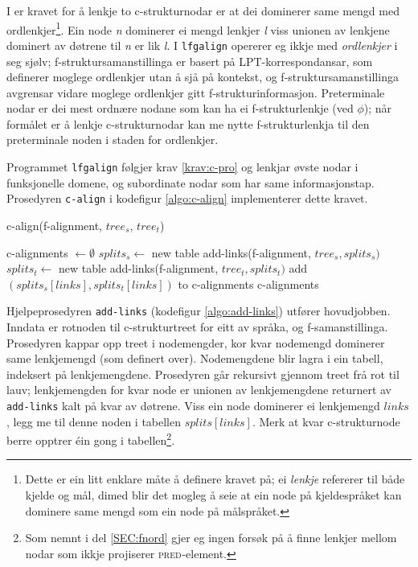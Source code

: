 \documentclass[12pt,a4paper,oneside,draft]{report}
\newcommand{\F}[2]{\textsc{#1}\ensuremath{_{#2}}}
\newcommand{\PRED}{\F{pred}{}}
\begin{document}
I \citet[s.~77]{dyvik2009lmp} er kravet for å lenkje to
c\hyp{}strukturnodar er at dei dominerer same mengd med
ordlenkjer\footnote{Dette er ein litt enklare måte å definere kravet på; ei
        \emph{lenkje} refererer til både kjelde og mål, dimed blir det
        mogleg å seie at ein node på kjeldespråket kan dominere same
        mengd som ein node på målspråket. }. Ein node \emph{n} dominerer ei mengd lenkjer \emph{l} viss
unionen av lenkjene dominert av døtrene til \emph{n} er lik \emph{l}. I
\texttt{lfgalign} opererer eg ikkje med \emph{ordlenkjer} i seg sjølv;
f\hyp{}struktursamanstillinga er basert på LPT\hyp{}korrespondansar, som
definerer moglege ordlenkjer utan å sjå på kontekst, og
f\hyp{}struktursamanstillinga avgrensar vidare moglege ordlenkjer gitt
f\hyp{}strukturinformasjon. Preterminale nodar er dei mest ordnære nodane
som kan ha ei f\hyp{}strukturlenkje (ved $\phi$); når formålet er å lenkje
c\hyp{}strukturnodar kan me nytte f\hyp{}strukturlenkja til den preterminale
noden i staden for ordlenkjer.

Programmet \texttt{lfgalign} følgjer krav \ref{krav:c-pro} og
lenkjar øvste nodar i funksjonelle domene, og subordinate nodar som
har same informasjonstap. Prosedyren \texttt{c-align} i kodefigur
\ref{algo:c-align} implementerer dette kravet. 

 \begin{algorithm}[htbp]
   \caption{c-align(f-alignment, $tree_s$, $tree_t$)}
   \label{algo:c-align}
    
   c-alignments $\gets \emptyset$ \;
   $splits_s \gets$ new table \;
   add-links(f-alignment, $tree_s, splits_s)$  \;
   $splits_t \gets$ new table \;
   add-links(f-alignment, $tree_t, splits_t)$  \;
    {
        {
             add $(splits_s[links],splits_t[links])$ to c-alignments \;
        }
    }
    \Return c-alignments \;
    \end{algorithm}    

Hjelpeprosedyren \texttt{add-links} (kodefigur \ref{algo:add-links}) utfører
 hovudjobben. Inndata er rotnoden til c\hyp{}strukturtreet for eitt av
 språka, og f-samanstillinga. Prosedyren kappar opp treet i
 nodemengder, kor kvar nodemengd dominerer same lenkjemengd (som
 definert over).  Nodemengdene blir lagra i ein tabell, indeksert på
 lenkjemengdene. Prosedyren går rekursivt gjennom treet frå rot til
 lauv; lenkjemengden for kvar node er unionen av lenkjemengdene
 returnert av \texttt{add-links} kalt på kvar av døtrene. Viss ein node
 dominerer ei lenkjemengd $links$, legg me til denne noden i tabellen
 $splits[links]$. Merk at kvar c\hyp{}strukturnode berre opptrer éin gong i
 tabellen\footnote{Som nemnt i del \ref{SEC:fnord} gjer eg ingen forsøk på å
        finne lenkjer mellom nodar som ikkje projiserer
        \PRED{}-element. }.
\end{document}
